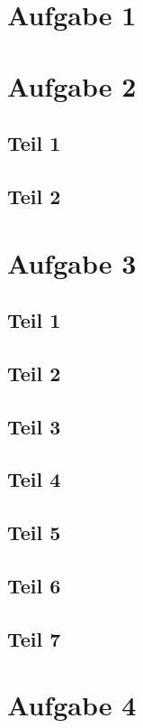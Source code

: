 \documentclass[10pt,a4paper]{article}
\begin{document}
\section{Aufgabe 1}

\section{Aufgabe 2}

\subsection{Teil 1}

\subsection{Teil 2}

\section{Aufgabe 3}

\subsection{Teil 1}

\subsection{Teil 2}

\subsection{Teil 3}

\subsection{Teil 4}

\subsection{Teil 5}

\subsection{Teil 6}

\subsection{Teil 7}

\section{Aufgabe 4}
\end{document}
